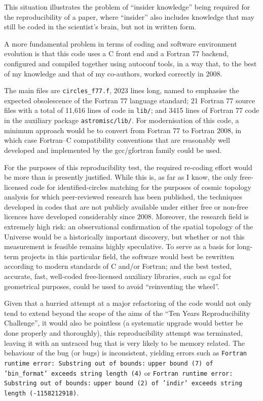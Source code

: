 This situation illustrates the problem of ``insider knowledge'' being
required for the reproducibility of a paper, where ``insider'' also
includes knowledge that may still be coded in the scientist's brain,
but not in written form.

A more fundamental problem in terms of coding and software
environment evolution is that this code uses a C front end and
a Fortran 77 backend, configured and compiled together using {\sc autoconf}
tools, in a way that, to the best of my knowledge and that of
my co-authors, worked correctly in 2008.

The main files are {\tt circles\_f77.f}, 2023 lines long, named to
emphasise the expected obsolescence of the Fortran 77 language
standard; 21 Fortran 77 source files with a total of 11,616 lines of
code in {\tt lib/}; and 3415 lines of Fortran 77 code in the auxiliary
package {\tt astromisc/lib/}. For modernisation of this code, a
minimum approach would be to convert from Fortran 77 to Fortran 2008,
in which case Fortran--C compatibility conventions that are reasonably well
developed and implemented by the {\sc gcc/gfortran} family could be used.

For the purposes of this reproducibility test, the required re-coding
effort would be more than is presently justified. While this is, as
far as I know, the only free-licensed code for identified-circles
matching for the purposes of cosmic topology analysis for which
peer-reviewed research has been published, the techniques developed in
codes that are not publicly available under either free or non-free
licences have developed considerably since 2008.  Moreover, the
research field is extremely high risk: an observational confirmation
of the spatial topology of the Universe would be a historically
important discovery, but whether or not this measurement is feasible
remains highly speculative. To serve as a basis for long-term
projects in this particular field, the software would best be
rewritten according to modern standards of C and/or Fortran; and
the best tested, accurate, fast, well-coded free-licensed
auxiliary libraries, such as {\sc cgal} for geometrical purposes,
could be used to avoid ``reinventing the wheel''.

Given that a hurried attempt at a major refactoring of the code would
not only tend to extend beyond the scope of the aims of the ``Ten
Years Reproducibility Challenge'', it would also be pointless (a
systematic upgrade would better be done properly and thoroughly),
this reproducibility attempt was terminated, leaving it with
an untraced bug that is very likely to be memory related. The behaviour
of the bug (or bugs) is inconsistent, yielding errors such as
\mbox{{\tt Fortran runtime error: Substring out of bounds:}}
\mbox{{\tt upper bound (7) of 'bin\_format' exceeds string length (4)}} or
\mbox{{\tt Fortran runtime error: Substring out of bounds:}}
\mbox{{\tt upper bound (2) of 'indir' exceeds string length (-1158212918)}}.
\sloppy

